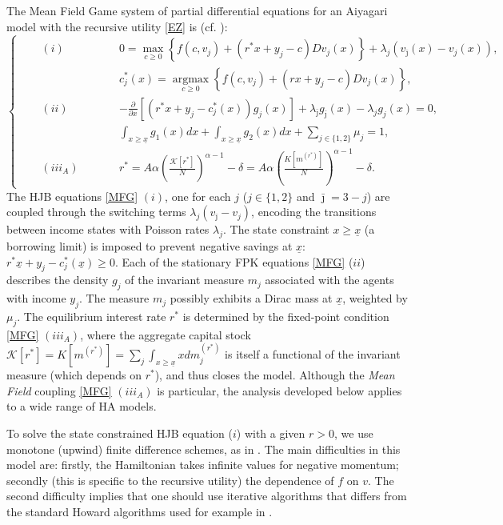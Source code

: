 \documentclass[11pt]{article}
\numberwithin{equation}{section}
\numberwithin{algorithm}{section}
\newcommand{\ux}{{\underline x}}
\theoremstyle{plain}
\begin{document}
The Mean Field Game system of partial differential equations for an Aiyagari model with the recursive utility \cref{EZ} is (cf. \cite[(1.7)]{Achdou:2026aa}):
\begin{equation}\label{MFG}
\left\{\begin{aligned}
\quad &(i)\qquad &&0 = \max_{c\ge 0} \left\{ f(c,v_j) +(r^*x+y_j - c)Dv_j(x) \right\}+\lambda_j(v_{\bar \jmath}(x)-v_j(x)),\\
&&&c_{j}^*(x)=\mathop{\arg \max}\limits_{c\ge 0} \left\{ f(c,v_j) +(rx+y_j - c)Dv_j(x) \right\},\\
&(ii)&&- \frac{\partial}{\partial x} \left[ (r^*x+y_j - c_{j}^*(x)) g_j(x) \right]+\lambda_{\bar \jmath}g_{\bar \jmath}(x) -\lambda_jg_j(x)=0,\\
&&&\int_{x\geq \ux} g_1(x)dx+\int_{x\geq \ux} g_2(x)dx+\sum_{j\in \{1,2\}}\mu_j=1,\\
&(iii_A)\qquad &&r^*=A\alpha \left(\frac{\mathcal{K}[r^*]}{N}\right)^{\alpha-1}-\delta=A\alpha \left(\frac{K[m^{(r^*)}]}{N}\right)^{\alpha-1}-\delta. 
\end{aligned}\right.
\end{equation}
The HJB equations \cref{MFG} $(i)$, one for each $j$ ($j\in \{1,2\}$ and $\bar\jmath=3-j$) are coupled through the  switching terms $\lambda_j(v_{\bar\jmath} - v_j)$, encoding the transitions between income states with Poisson rates $\lambda_j$. The state constraint $x \geq \ux$ (a borrowing limit) is imposed to prevent negative savings at $\ux$: $r^*\ux+y_j - c^*_j(\ux)\geq 0$. Each of the stationary FPK equations \cref{MFG} ($ii$) describes the density $g_j$ of the invariant measure $m_j$ associated with the agents with income $y_j$. The measure $m_j$ possibly exhibits a Dirac mass at $\ux$, weighted by $\mu_j$. The equilibrium interest rate $r^*$ is determined by the fixed-point condition \cref{MFG} $(iii_A)$, where the aggregate capital stock $\mathcal{K}[r^*]=K[m^{(r^*)}]=\sum_j\int_{x\geq \ux}xdm^{(r^*)}_j$ is itself a functional of the invariant measure (which depends on $r^*$), and thus closes the model. Although the {\textit{Mean Field}} coupling \cref{MFG} $(iii_A)$ is particular, the analysis developed below applies to a wide range of HA models.
 \par
 To solve the state constrained HJB equation ($i$) with a given $r>0$, we use monotone (upwind) finite difference schemes, as in \cite{MR2679575,achdou2022income,camilli2025learning,lauriere2023policy,tang2023learning}. The main difficulties in this model are: firstly, the Hamiltonian takes infinite values for negative momentum; secondly (this is specific to the recursive utility) the dependence of $f$ on $v$. The second difficulty implies that one should use iterative algorithms that differs from the standard Howard algorithms used for example in \cite{achdou2022income,camilli2025learning}. 
\end{document}
